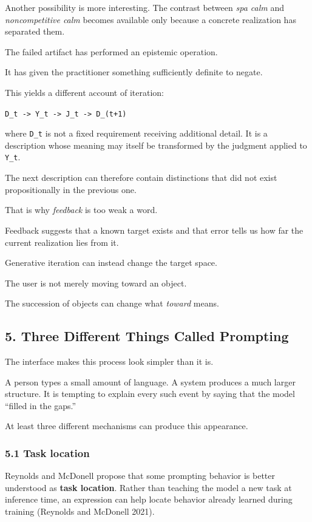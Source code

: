 \documentclass[
]{article}
\begin{document}
Another possibility is more interesting. The contrast between \emph{spa
calm} and \emph{noncompetitive calm} becomes available only because a
concrete realization has separated them.

The failed artifact has performed an epistemic operation.

It has given the practitioner something sufficiently definite to negate.

This yields a different account of iteration:

\texttt{D\_t\ -\textgreater{}\ Y\_t\ -\textgreater{}\ J\_t\ -\textgreater{}\ D\_(t+1)}

where \texttt{D\_t} is not a fixed requirement receiving additional
detail. It is a description whose meaning may itself be transformed by
the judgment applied to \texttt{Y\_t}.

The next description can therefore contain distinctions that did not
exist propositionally in the previous one.

That is why \emph{feedback} is too weak a word.

Feedback suggests that a known target exists and that error tells us how
far the current realization lies from it.

Generative iteration can instead change the target space.

The user is not merely moving toward an object.

The succession of objects can change what \emph{toward} means.

\subsection{5. Three Different Things Called
Prompting}\label{three-different-things-called-prompting}

The interface makes this process look simpler than it is.

A person types a small amount of language. A system produces a much
larger structure. It is tempting to explain every such event by saying
that the model ``filled in the gaps.''

At least three different mechanisms can produce this appearance.

\subsubsection{5.1 Task location}\label{task-location}

Reynolds and McDonell propose that some prompting behavior is better
understood as \textbf{task location}. Rather than teaching the model a
new task at inference time, an expression can help locate behavior
already learned during training (Reynolds and McDonell 2021).
\end{document}
